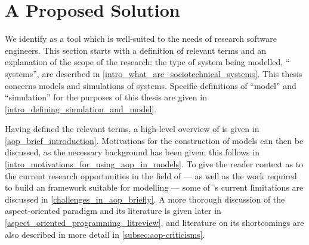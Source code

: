 \section{A Proposed Solution}
\label{intro_proposed_solution}
We identify \aop{} as a tool which is well-suited to the needs of research
software engineers. This section starts with a definition of relevant terms and
an explanation of the scope of the research: the type of system being modelled,
``\sociotechnical{} systems'', are described in
\cref{intro_what_are_sociotechnical_systems}. This thesis concerns models and
simulations of \sociotechnical systems. Specific definitions of ``model'' and
``simulation'' for the purposes of this thesis are given in
\cref{intro_defining_simulation_and_model}.


Having defined the relevant terms, a high-level overview of \aop{} is given in
\cref{aop_brief_introduction}. Motivations for the construction of
\aspectoriented{} models can then be discussed, as the necessary background has
been given; this follows in \cref{intro_motivations_for_using_aop_in_models}. To
give the reader context as to the current research opportunities in the field of
\aop{} --- as well as the work required to build an \aspectorientation{}
framework suitable for \aspectoriented{} modelling --- some of \aop{}'s current
limitations are discussed in \cref{challenges_in_aop_briefly}. A more thorough
discussion of the aspect-oriented paradigm and its literature is given later in
\cref{aspect_oriented_programming_litreview}, and literature on its shortcomings
are also described in more detail in \cref{subsec:aop-criticisms}.





